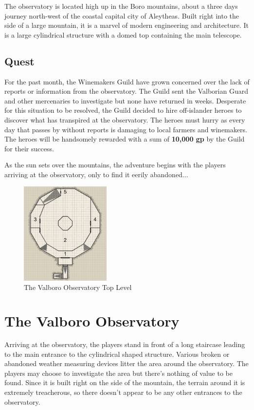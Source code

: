 \documentclass{article}
\begin{document}
\begin{multicols*}{2}
	The observatory is located high up in the Boro mountains, about a three days journey north-west of the coastal capital city of Aleytheas. Built right into the side of a large mountain, it is a marvel of modern engineering and architecture. It is a large cylindrical structure with a domed top containing the main telescope.
	
	\subsection*{Quest}
	For the past month, the Winemakers Guild have grown concerned over the lack of reports or information from the observatory. The Guild sent the Valborian Guard and other mercenaries to investigate but none have returned in weeks. Desperate for this situation to be resolved, the Guild decided to hire off-islander heroes to discover what has transpired at the observatory. The heroes must hurry as every day that passes by without reports is damaging to local farmers and winemakers. The heroes will be handsomely rewarded with a sum of \textbf{10,000 gp} by the Guild for their success.
	
	As the sun sets over the mountains, the adventure begins with the players arriving at the observatory, only to find it eerily abandoned...
	
	\begin{figure}
	\centering
	\includegraphics[width=0.4\textwidth]{images/observatory}
	\caption{The Valboro Observatory Top Level}
	\end{figure}


	\section{The Valboro Observatory}
	Arriving at the observatory, the players stand in front of a long staircase leading to the main entrance to the cylindrical shaped structure. Various broken or abandoned weather measuring devices litter the area around the observatory. The players may choose to investigate the area but there's nothing of value to be found. Since it is built right on the side of the mountain, the terrain around it is extremely treacherous, so there doesn't appear to be any other entrances to the observatory.
	

\end{multicols*}
\end{document}
